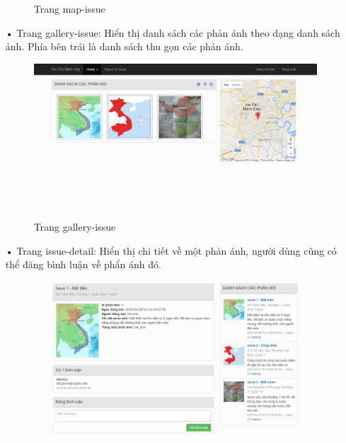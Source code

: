 \documentclass[a4paper]{article}
\begin{document}
\begin{itemize}
\begin{center}
\begin{figure}[htp]
\begin{center}
    	\end{center}
    	\caption{Trang map-issue}
    	\label{refhinh1}
    	\end{figure}
    \end{center}
	\item[•]Trang gallery-issue: Hiển thị danh sách các phản ánh theo dạng danh sách ảnh. Phía bên trái là danh sách thu gọn các phản ánh.
	\begin{center}
    	\begin{figure}[htp]
    	\begin{center}
    	 	\includegraphics[scale=.4]{gallery-issue.PNG}
    	\end{center}
    	\caption{Trang gallery-issue}
    	\label{refhinh1}
    	\end{figure}
    \end{center}
	\item[•]Trang issue-detail: Hiển thị chi tiết về một phản ánh, người dùng cũng có thể đăng bình luận về phẩn ánh đó.
	\begin{center}
    	\begin{figure}[htp]
    	\begin{center}
    	 	\includegraphics[scale=.4]{issue-detail.PNG}

\end{center}
\end{figure}
\end{center}
\end{itemize}
\end{document}
